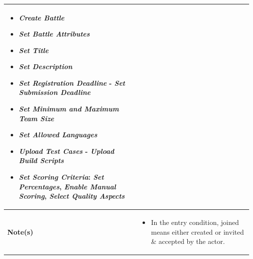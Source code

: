 \begin{enumerate}
\begin{center}
\begin{tabular}{ | m{5em} | m{13cm}| }
    
      \begin{itemize}
          \item \textit{Create Battle}
          \item \textit{Set Battle Attributes}
          \item \textit{Set Title}
          \item \textit{Set Description}
          \item \textit{Set Registration Deadline} - \textit{Set Submission Deadline}
          \item \textit{Set Minimum and Maximum Team Size}
          \item \textit{Set Allowed Languages}
          \item \textit{Upload Test Cases} - \textit{Upload Build Scripts}
          \item \textit{Set Scoring Criteria}: \textit{Set Percentages}, \textit{Enable Manual Scoring}, \textit{Select Quality Aspects}
      \end{itemize}
          \\ 
      \hline
      \textbf{Note(s)} & 
      \begin{itemize}
          \item In the entry condition, joined means either created or invited \& accepted by the actor.
      \end{itemize}
          \\ 
      \hline
    \end{tabular}
    \label{tbl:uc24}
\end{center} 


\newpage


\end{enumerate}
